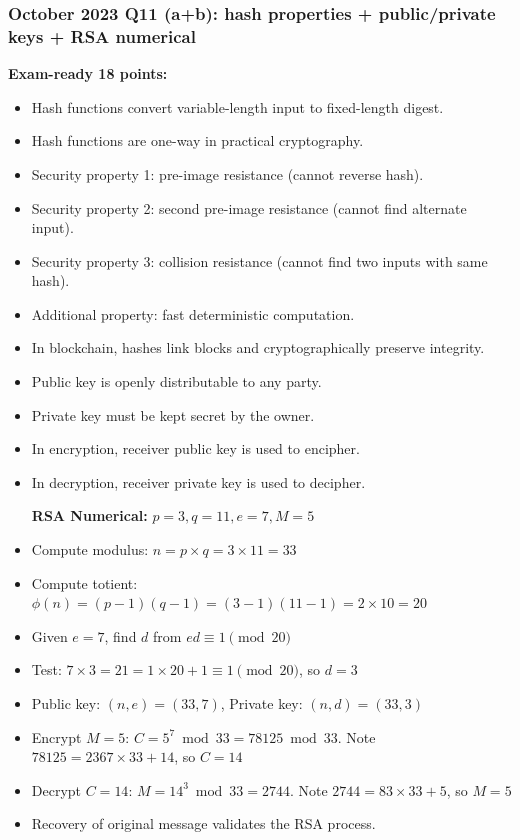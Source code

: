 \documentclass[12pt,a4paper]{article}
\begin{document}
\subsubsection*{October 2023 Q11 (a+b): hash properties + public/private keys + RSA numerical}
\textbf{Exam-ready 18 points:}
\begin{itemize}
\item Hash functions convert variable-length input to fixed-length digest.
\item Hash functions are one-way in practical cryptography.
\item Security property 1: pre-image resistance (cannot reverse hash).
\item Security property 2: second pre-image resistance (cannot find alternate input).
\item Security property 3: collision resistance (cannot find two inputs with same hash).
\item Additional property: fast deterministic computation.
\item In blockchain, hashes link blocks and cryptographically preserve integrity.
\item Public key is openly distributable to any party.
\item Private key must be kept secret by the owner.
\item In encryption, receiver public key is used to encipher.
\item In decryption, receiver private key is used to decipher.

\textbf{RSA Numerical: } \(p=3, q=11, e=7, M=5\)
\item Compute modulus: \(n = p \times q = 3 \times 11 = 33\)
\item Compute totient: \(\phi(n) = (p-1)(q-1) = (3-1)(11-1) = 2 \times 10 = 20\)
\item Given \(e=7\), find \(d\) from \(ed \equiv 1 \pmod{20}\)
\item Test: \(7 \times 3 = 21 = 1 \times 20 + 1 \equiv 1 \pmod{20}\), so \(d=3\)
\item Public key: \((n,e)=(33,7)\), Private key: \((n,d)=(33,3)\)
\item Encrypt \(M=5\): \(C = 5^7 \bmod 33 = 78125 \bmod 33\). Note \(78125 = 2367 \times 33 + 14\), so \(C=14\)
\item Decrypt \(C=14\): \(M = 14^3 \bmod 33 = 2744\). Note \(2744 = 83 \times 33 + 5\), so \(M=5\)
\item Recovery of original message validates the RSA process.
\end{itemize}
\end{document}
